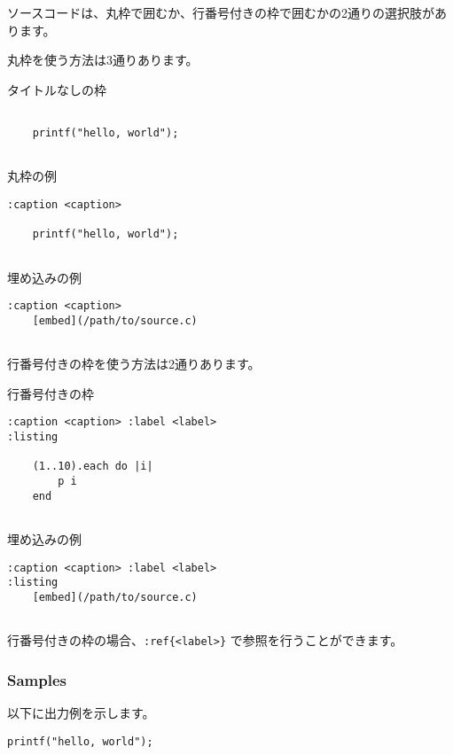 \documentclass[a4j, titlepage]{jarticle}
\begin{document}
ソースコードは、丸枠で囲むか、行番号付きの枠で囲むかの2通りの選択肢があります。

丸枠を使う方法は3通りあります。

\begin{itembox}[c]{タイトルなしの枠}
\begin{verbatim}
　
    printf("hello, world");
　
\end{verbatim}
\end{itembox}

\begin{itembox}[c]{丸枠の例}
\begin{verbatim}
:caption <caption>

    printf("hello, world");
　
\end{verbatim}
\end{itembox}

\begin{itembox}[c]{埋め込みの例}
\begin{verbatim}
:caption <caption>
    [embed](/path/to/source.c)
　
\end{verbatim}
\end{itembox}

行番号付きの枠を使う方法は2通りあります。

\begin{itembox}[c]{行番号付きの枠}
\begin{verbatim}
:caption <caption> :label <label>
:listing

    (1..10).each do |i|
        p i
    end
　
\end{verbatim}
\end{itembox}

\begin{itembox}[c]{埋め込みの例}
\begin{verbatim}
:caption <caption> :label <label>
:listing
    [embed](/path/to/source.c)
　
\end{verbatim}
\end{itembox}

行番号付きの枠の場合、{\tt :}{\tt ref\{\textless{}label\textgreater{}\}} で参照を行うことができます。

\subsubsection{Samples}

以下に出力例を示します。

\begin{screen}
\begin{verbatim}
printf("hello, world");
\end{verbatim}
\end{screen}
\end{document}
